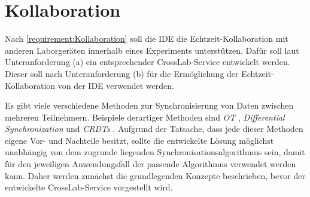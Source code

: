 \section{Kollaboration}\label{section:konzeption:kollaboration}

\usetikzlibrary{arrows.meta}


Nach \autoref{requirement:Kollaboration} soll die IDE die Echtzeit-Kollaboration mit anderen Laborgeräten innerhalb eines Experiments unterstützen. Dafür soll laut Unteranforderung (a) ein entsprechender CrossLab-Service entwickelt werden. Dieser soll nach Unteranforderung (b) für die Ermöglichung der Echtzeit-Kollaboration von der IDE verwendet werden.

Es gibt viele verschiedene Methoden zur Synchronisierung von Daten zwischen mehreren Teilnehmern. Beispiele derartiger Methoden sind \emph{\ac{OT}} \cite{sun_operational_1998}, \emph{Differential Synchronization} \cite{fraser_differential_2009} und \emph{\acp{CRDT}} \cite{shapiro_conflict-free_2011}. Aufgrund der Tatsache, dass jede dieser Methoden eigene Vor- und Nachteile besitzt, sollte die entwickelte Lösung möglichst unabhängig von dem zugrunde liegenden Synchronisationsalgorithmus sein, damit für den jeweiligen Anwendungsfall der passende Algorithmus verwendet werden kann. Daher werden zunächst die grundlegenden Konzepte beschrieben, bevor der entwickelte CrossLab-Service vorgestellt wird.

